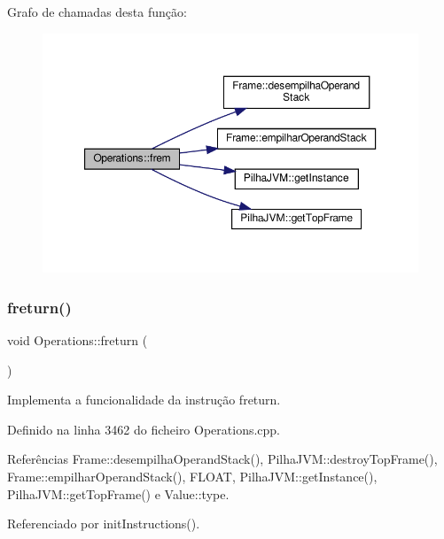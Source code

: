 Grafo de chamadas desta função\+:\nopagebreak
\begin{figure}[H]
\begin{center}
\leavevmode
\includegraphics[width=350pt]{classOperations_ad29eac4f222e4b74667086c3da0d5538_cgraph}
\end{center}
\end{figure}
\mbox{\label{classOperations_a701431fe6d5d20fafa747dbeae90e1d4}} 
\subsubsection{\texorpdfstring{freturn()}{freturn()}}
{\footnotesize\ttfamily void Operations\+::freturn (\begin{DoxyParamCaption}{ }\end{DoxyParamCaption})\hspace{0.3cm}{\ttfamily [private]}}



Implementa a funcionalidade da instrução freturn. 



Definido na linha 3462 do ficheiro Operations.\+cpp.



Referências Frame\+::desempilha\+Operand\+Stack(), Pilha\+J\+V\+M\+::destroy\+Top\+Frame(), Frame\+::empilhar\+Operand\+Stack(), F\+L\+O\+AT, Pilha\+J\+V\+M\+::get\+Instance(), Pilha\+J\+V\+M\+::get\+Top\+Frame() e Value\+::type.



Referenciado por init\+Instructions().

